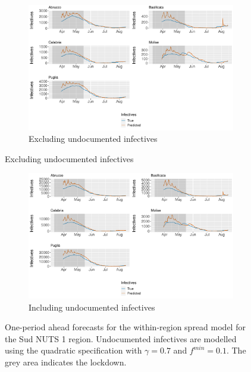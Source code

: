 \documentclass[12pt]{article}
\begin{document}
\begin{appendices}
		\begin{figure}[H]
    	    \centering
    	    \begin{subfigure}{\textwidth}
    	      \centering
    	      \includegraphics[width=0.94\linewidth]{output/model_within_lag14_forecast_start20_Sud_rolling.pdf}
    	      \caption{Excluding undocumented infectives}
    	      \label{fig:forecast_within_sud_regular}
    	    \end{subfigure}
        \end{figure}
        \begin{figure}[H]\ContinuedFloat
    	    \begin{subfigure}{\textwidth}
    	      \centering
    	      \includegraphics[width=0.94\linewidth]{output/model_within_lag14_forecast_start20_Sud_UndocQuadratic_rolling.pdf}
    	      \caption{Including undocumented infectives}
    	      \label{fig:forecast_within_sud_undoc}
    	    \end{subfigure}
    	    \caption{One-period ahead forecasts for the within-region spread model for the Sud NUTS 1 region. Undocumented infectives are modelled using the quadratic specification with $\gamma = 0.7$ and $f^{min}=0.1$. The grey area indicates the lockdown.}
    	    \label{fig:forecast_within_sud}
        \end{figure}
		

\end{appendices}
\end{document}
